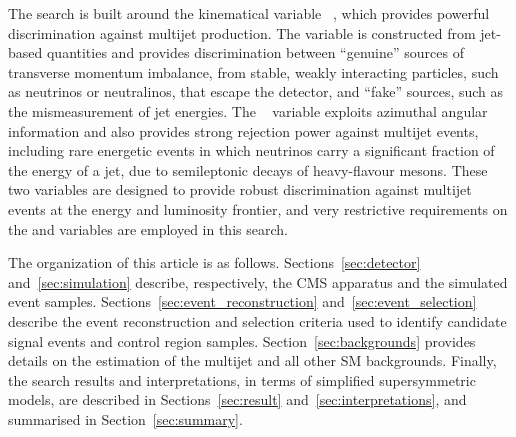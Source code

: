 The search is built around the kinematical variable
\alphat~\cite{Randall:2008rw, RA1Paper}, which provides powerful
discrimination against multijet production. The \alphat variable is
constructed from jet-based quantities and provides discrimination
between ``genuine'' sources of transverse momentum imbalance, from
stable, weakly interacting particles, such as neutrinos or
neutralinos, that escape the detector, and ``fake'' sources, such as
the mismeasurement of jet energies.  The \bdphi~\cite{RA1Paper}
variable exploits azimuthal angular information and also provides
strong rejection power against multijet events, including rare
energetic events in which neutrinos carry a significant fraction of
the energy of a jet, due to semileptonic decays of heavy-flavour
mesons.  These two variables are designed to provide robust
discrimination against multijet events at the energy and luminosity
frontier, and very restrictive requirements on the \alphat and \dphi
variables are employed in this search.

The organization of this article is as
follows. Sections~\ref{sec:detector} and~\ref{sec:simulation}
describe, respectively, the CMS apparatus and the simulated event
samples. Sections~\ref{sec:event_reconstruction}
and~\ref{sec:event_selection} describe the event reconstruction and
selection criteria used to identify candidate signal events and
control region samples. Section~\ref{sec:backgrounds} provides details
on the estimation of the multijet and all other SM
backgrounds. Finally, the search results and interpretations, in terms
of simplified supersymmetric models, are described in
Sections~\ref{sec:result} and~\ref{sec:interpretations}, and
summarised in Section~\ref{sec:summary}.


